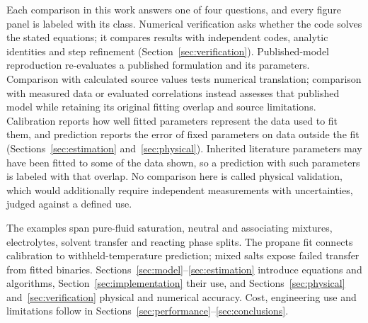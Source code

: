 Each comparison in this work answers one of four questions, and every figure panel is labeled with its class.
Numerical verification asks whether the code solves the stated equations; it compares results with independent codes, analytic identities and step refinement (Section~\ref{sec:verification}).
Published-model reproduction re-evaluates a published formulation and its parameters.
Comparison with calculated source values tests numerical translation; comparison with measured data or evaluated correlations instead assesses that published model while retaining its original fitting overlap and source limitations.
Calibration reports how well fitted parameters represent the data used to fit them, and prediction reports the error of fixed parameters on data outside the fit (Sections~\ref{sec:estimation} and~\ref{sec:physical}).
Inherited literature parameters may have been fitted to some of the data shown, so a prediction with such parameters is labeled with that overlap.
No comparison here is called physical validation, which would additionally require independent measurements with uncertainties, judged against a defined use.


The examples span pure-fluid saturation, neutral and associating mixtures, electrolytes, solvent transfer and reacting phase splits.
The propane fit connects calibration to withheld-temperature prediction; mixed salts expose failed transfer from fitted binaries.
Sections~\ref{sec:model}--\ref{sec:estimation} introduce equations and algorithms, Section~\ref{sec:implementation} their use, and Sections~\ref{sec:physical} and~\ref{sec:verification} physical and numerical accuracy.
Cost, engineering use and limitations follow in Sections~\ref{sec:performance}--\ref{sec:conclusions}.


